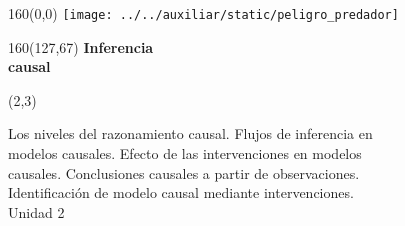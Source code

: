 \documentclass[shownotes,aspectratio=169]{beamer}
\begin{document}
\color{black!85}
\large


\begin{frame}

\begin{textblock}{160}(0,0)
\texttt{[image: ../../auxiliar/static/peligro\_predador]}
\end{textblock}

\begin{textblock}{160}(127,67)
\LARGE \textcolor{black!5}{\fontsize{22}{0}\selectfont \textbf{Inferencia  \\[-0.1cm] \hspace{0.5cm} causal}}
\end{textblock}

\begin{textblock}{55}(2,3)
\begin{turn}{0}
\parbox{15cm}{\small
\textcolor{black!95}{Los niveles del razonamiento causal. Flujos de inferencia en}\\
\textcolor{black!95}{modelos causales. Efecto de las intervenciones en modelos} \\
\textcolor{black!95}{causales. Conclusiones causales a partir de observaciones.} \\
\textcolor{black!95}{Identificación de modelo causal mediante intervenciones.} \\
\normalsize\textcolor{black!95}{Unidad 2} \\
}
\end{turn}
\end{textblock}

\end{frame}



%
%
%
%
%
\end{document}
